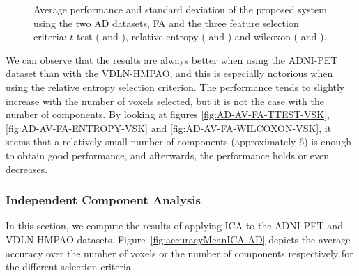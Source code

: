 \begin{figure}
	
	\caption{Average performance and standard deviation of the proposed system using the two \ac{AD} datasets, \ac{FA} and the three feature selection criteria: $t$-test (\protect{} and \protect{}), relative entropy (\protect{} and \protect{}) and wilcoxon (\protect{} and \protect{}). } 
	\label{fig:accuracyMeanFA-AD}
\end{figure}

We can observe that the results are always better when using the ADNI-PET dataset than with the VDLN-HMPAO, and this is especially notorious when using the relative entropy selection criterion. The performance tends to slightly increase with the number of voxels selected, but it is not the case with the number of components. By looking at figures \ref{fig:AD-AV-FA-TTEST-VSK}, \ref{fig:AD-AV-FA-ENTROPY-VSK} and \ref{fig:AD-AV-FA-WILCOXON-VSK}, it seems that a relatively small number of components (approximately 6) is enough to obtain good performance, and afterwards, the performance holds or even decreases. 

\subsubsection{Independent Component Analysis}
In this section, we compute the results of applying \ac{ICA} to the ADNI-PET and VDLN-HMPAO datasets. Figure~\ref{fig:accuracyMeanICA-AD} depicts the average accuracy over the number of voxels or the number of components respectively for the different selection criteria. 

